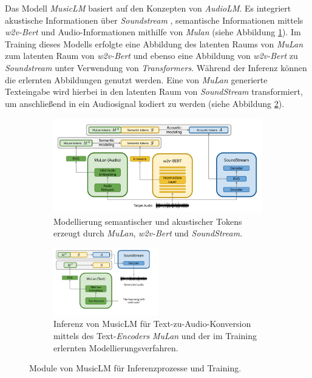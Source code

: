 \documentclass[
  a4paper,  %
  twoside,  %
  bibliography=totoc,
  headsepline,
  cleardoublepage=empty,
  parskip=half,
  draft=false
]{scrbook}
\begin{document}
Das Modell \emph{MusicLM} \cite{agostinelli_musiclm_2023} basiert auf den Konzepten von \emph{AudioLM}. Es integriert akustische Informationen über \emph{Soundstream} \cite{zeghidour_soundstream_2021}, semantische Informationen mittels \emph{w2v-Bert} \cite{chung_w2v-bert_2021-1} und Audio-Informationen mithilfe von \emph{Mulan} \cite{huang_mulan_2022} (siehe Abbildung \ref{fig:MusicLM_tokens}). Im Training dieses Modells erfolgte eine Abbildung des latenten Raums von \emph{MuLan} zum latenten Raum von \emph{w2v-Bert} und ebenso eine Abbildung von \emph{w2v-Bert} zu \emph{Soundstream} unter Verwendung von \emph{Transformers}. Während der Inferenz können die erlernten Abbildungen genutzt werden. Eine von \emph{MuLan} generierte Texteingabe wird hierbei in den latenten Raum von \emph{SoundStream} transformiert, um anschließend in ein Audiosignal kodiert zu werden (siehe Abbildung \ref{fig:MusicLM_Inference}). \cite{agostinelli_musiclm_2023}

\begin{figure}[h]
\centering
\begin{subfigure}{.8\textwidth}
  \centering
  \includegraphics[width=1\textwidth]{graphics/MusicLM1.png}
  \caption[MusicLM Tokenisierung]{Modellierung semantischer und akustischer Tokens erzeugt durch \emph{MuLan}, \emph{w2v-Bert} und \emph{SoundStream}. \cite{agostinelli_musiclm_2023}}
  \label{fig:MusicLM_tokens}
\end{subfigure}

\vspace{1em} %

\begin{subfigure}{1.0\textwidth}
  \centering
  \includegraphics[width=0.5\textwidth]{graphics/MusicLM2.png}
  \caption[MusicLM Inferenz]{Inferenz von MusicLM für Text-zu-Audio-Konversion mittels des Text-\emph{Encoders} \emph{MuLan} und der im Training erlernten Modellierungsverfahren. \cite{agostinelli_musiclm_2023}}
  \label{fig:MusicLM_Inference}
\end{subfigure}
\caption[MusicLM Module]{Module von MusicLM für Inferenzprozesse und Training. \cite{agostinelli_musiclm_2023}}
\label{fig:test}
\end{figure}
\end{document}
